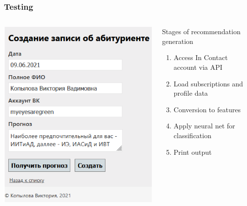 \documentclass[10pt,dvipsnames]{beamer}
\begin{document}
\begin{frame}
  \frametitle{Testing}
  \begin{columns}
    \begin{column}{0.5\linewidth}
      \includegraphics[width=\linewidth]{pics/2-example.png}
    \end{column}
    \begin{column}{0.5\linewidth}
      Stages of recommendation generation
      \begin{enumerate}
      \item Access In Contact account via API
      \item Load subscriptions and profile data
      \item Conversion to features
      \item Apply neural net for classification
      \item Print output
      \end{enumerate}
    \end{column}
  \end{columns}
\end{frame}
\end{document}
